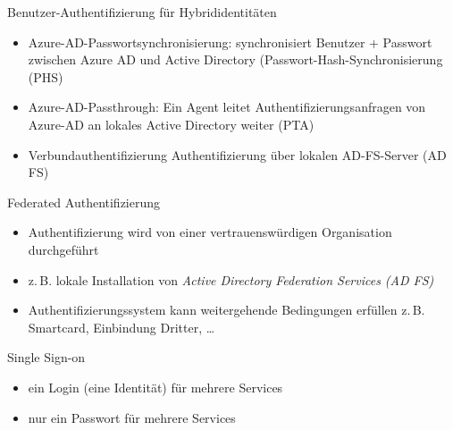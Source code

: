 \begin{flashcard}[Definition]{Benutzer-Authentifizierung für Hybrididentitäten}
    \begin{itemize}
        \item Azure-AD-Passwortsynchronisierung:\newline
            synchronisiert Benutzer + Passwort zwischen Azure AD und Active Directory\newline
            (Passwort-Hash-Synchronisierung (PHS)
        \item Azure-AD-Passthrough:\newline
            Ein Agent leitet Authentifizierungsanfragen von Azure-AD an lokales Active Directory weiter\newline
            (PTA)
        \item Verbundauthentifizierung\newline
            Authentifizierung über lokalen AD-FS-Server\newline
            (AD FS)
    \end{itemize}
\end{flashcard}


\begin{flashcard}[Definition]{Federated Authentifizierung}
    \begin{itemize}
        \item Authentifizierung wird von einer vertrauenswürdigen Organisation durchgeführt
        \item z.\,B. lokale Installation von \emph{Active Directory Federation Services (AD FS)}
        \item Authentifizierungssystem kann weitergehende Bedingungen erfüllen\newline
            z.\,B. Smartcard, Einbindung Dritter, \ldots
    \end{itemize}
\end{flashcard}


\begin{flashcard}[Definition]{Single Sign-on}
    \begin{itemize}
        \item ein Login (eine Identität) für mehrere Services
        \item nur ein Passwort für mehrere Services
    \end{itemize}
\end{flashcard}

